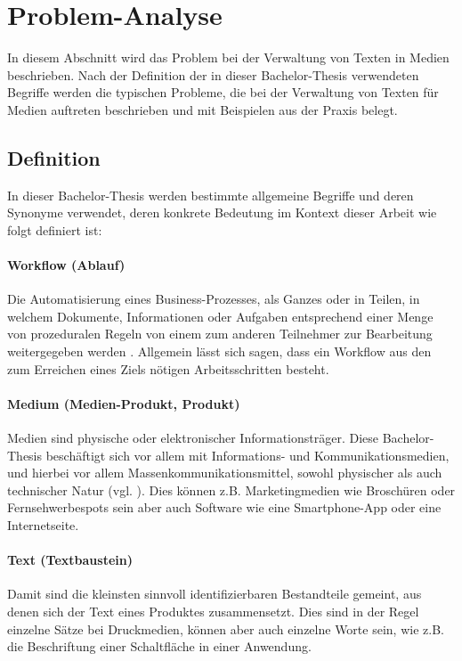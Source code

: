 \section{Problem-Analyse}

In diesem Abschnitt wird das Problem bei der Verwaltung von Texten in Medien beschrieben. Nach der Definition der in dieser Bachelor-Thesis verwendeten Begriffe werden die typischen Probleme, die bei der Verwaltung von Texten für Medien auftreten beschrieben und mit Beispielen aus der Praxis belegt.

\subsection{Definition}
\label{l:def}

In dieser Bachelor-Thesis werden bestimmte allgemeine Begriffe und deren Synonyme verwendet, deren konkrete Bedeutung im Kontext dieser Arbeit wie folgt definiert ist:

\paragraph{Workflow (Ablauf)} Die Automatisierung eines Business-Prozesses, als Ganzes oder in Teilen, in welchem Dokumente, Informationen oder Aufgaben entsprechend einer Menge von prozeduralen Regeln von einem zum anderen Teilnehmer zur Bearbeitung weitergegeben werden \cite[S.8]{wmc}. Allgemein lässt sich sagen, dass ein Workflow aus den zum Erreichen eines Ziels nötigen Arbeitsschritten besteht.

\paragraph{Medium (Medien-Produkt, Produkt)} Medien sind physische oder elektronischer Informationsträger. Diese Bachelor-Thesis beschäftigt sich vor allem mit Informations- und Kommunikationsmedien, und hierbei vor allem Massenkommunikationsmittel, sowohl physischer als auch technischer Natur (vgl. \cite[S.199–201]{schanze2002metzler}). Dies können z.B. Marketingmedien wie Broschüren oder Fernsehwerbespots sein aber auch Software wie eine Smartphone-App oder eine Internetseite. 

\paragraph{Text (Textbaustein)} Damit sind die kleinsten sinnvoll identifizierbaren Bestandteile gemeint, aus denen sich der Text eines Produktes zusammensetzt. Dies sind in der Regel einzelne Sätze bei Druckmedien, können aber auch einzelne Worte sein, wie z.B. die Beschriftung einer Schaltfläche in einer Anwendung.


